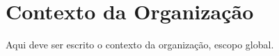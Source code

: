 \chapter[Contexto da Organização]{Contexto da Organização}
Aqui deve ser escrito o contexto da organização, escopo global.
